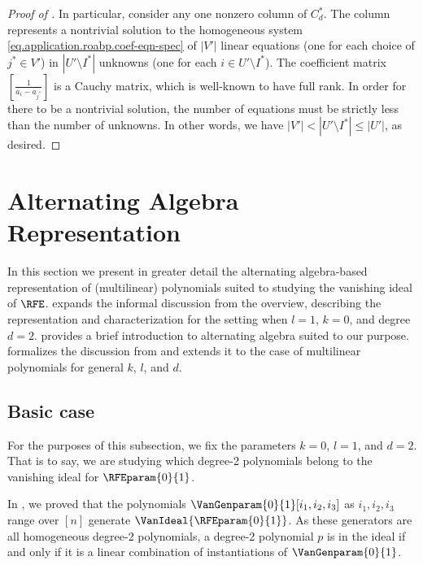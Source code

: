 \begin{proof}[Proof of ]
  In particular, consider any one nonzero column of \(C^*_d\).
  The column represents a nontrivial solution to the homogeneous system
  \eqref{eq.application.roabp.coef-eqn-spec} of $|V'|$ linear equations
  (one for each choice of $j^* \in V'$) in $|U' \setminus I^*|$ unknowns
  (one for each $i \in U' \setminus I^*$).
  The coefficient matrix $[ \frac{1}{a_i - a_{j^*}} ]$ is a Cauchy matrix,
  which is well-known to have full rank.
  In order for there to be a nontrivial solution,
  the number of equations must be strictly less than the number of unknowns.
  In other words,
  we have \(|V'| < |U'\setminus I^*| \le |U'|\),
  as desired.
\end{proof}


\section{Alternating Algebra Representation}
\label{s.simplicial-repr}

In this section we present in greater detail the alternating
algebra-based representation of (multilinear) polynomials suited to studying the vanishing ideal of \(\RFE\).
 expands the informal discussion from the overview,
describing the representation and characterization for
the setting when \(l=1\), \(k=0\), and degree $d=2$.
 provides a brief
introduction to alternating algebra suited to our purpose. 
formalizes the discussion from  and
extends it to the case of multilinear polynomials for general \(k\), \(l\), and \(d\).

\subsection{Basic case}
\label{s.simplicial-repr.base-case}

For the purposes of this subsection, we fix the parameters \(k=0\), \(l=1\), and \(d=2\).
That is to say, we are studying which degree-2 polynomials  belong to the vanishing ideal for \(\RFEparam{0}{1}\). 

In ,
we proved that the polynomials \(\VanGenparam{0}{1}[i_1, i_2, i_3]\) as
\(i_1,i_2,i_3\) range over \([n]\) generate \(\VanIdeal{\RFEparam{0}{1}}\).
As these generators are all homogeneous degree-2 polynomials,
a degree-2 polynomial $p$ is in the ideal if and only if it is a linear
combination of instantiations of \(\VanGenparam{0}{1}\). 

